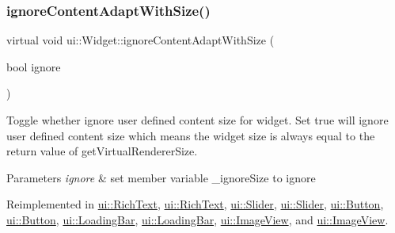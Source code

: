 \mbox{\label{classui_1_1Widget_a8971609befb6edde5b81a84dd7e8a52c}} 
\subsubsection{\texorpdfstring{ignore\+Content\+Adapt\+With\+Size()}{ignoreContentAdaptWithSize()}\hspace{0.1cm}{\footnotesize\ttfamily [2/2]}}
{\footnotesize\ttfamily virtual void ui\+::\+Widget\+::ignore\+Content\+Adapt\+With\+Size (\begin{DoxyParamCaption}\item[{bool}]{ignore }\end{DoxyParamCaption})\hspace{0.3cm}{\ttfamily [virtual]}}

Toggle whether ignore user defined content size for widget. Set true will ignore user defined content size which means the widget size is always equal to the return value of {\ttfamily get\+Virtual\+Renderer\+Size}.


\begin{DoxyParams}{Parameters}
{\em ignore} & set member variable \+\_\+ignore\+Size to ignore \\
\hline
\end{DoxyParams}


Reimplemented in \hyperlink{classui_1_1RichText_a82b3965a42f134415afab5605ef73ffa}{ui\+::\+Rich\+Text}, \hyperlink{classui_1_1RichText_a82b3965a42f134415afab5605ef73ffa}{ui\+::\+Rich\+Text}, \hyperlink{classui_1_1Slider_a080562522a4e6fc174fda2cdb6b111af}{ui\+::\+Slider}, \hyperlink{classui_1_1Slider_aa99728d692807df976fa1be592a2838d}{ui\+::\+Slider}, \hyperlink{classui_1_1Button_ad7f80b2facb4b54b8c65fc17dbb7ddda}{ui\+::\+Button}, \hyperlink{classui_1_1Button_acc4c34750dcf72800cebb9bcd3a45b11}{ui\+::\+Button}, \hyperlink{classui_1_1LoadingBar_aef1d41416277666e74f953b072f54964}{ui\+::\+Loading\+Bar}, \hyperlink{classui_1_1LoadingBar_a36fd58efdbc7b7e01adab806f2eab6f2}{ui\+::\+Loading\+Bar}, \hyperlink{classui_1_1ImageView_ac9fea31a3800b0960189d168d90ccb19}{ui\+::\+Image\+View}, and \hyperlink{classui_1_1ImageView_a0c1dbff2c1c5d14ac45f76d6daffadb5}{ui\+::\+Image\+View}.

\mbox{\label{classui_1_1Widget_a7c8b52f349c997848f23896acba7a44f}} 
